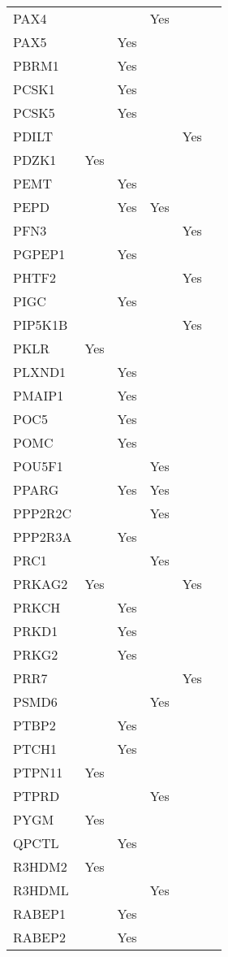 \documentclass[]{report}
\begin{document}
\begin{appendices}
\begin{longtable}[t]{llllll}
PAX4 &  &  & Yes &  & \\
PAX5 &  & Yes &  &  & \\
PBRM1 &  & Yes &  &  & \\
PCSK1 &  & Yes &  &  & \\
PCSK5 &  & Yes &  &  & \\
PDILT &  &  &  & Yes & \\
PDZK1 & Yes &  &  &  & \\
PEMT &  & Yes &  &  & \\
PEPD &  & Yes & Yes &  & \\
PFN3 &  &  &  & Yes & \\
PGPEP1 &  & Yes &  &  & \\
PHTF2 &  &  &  & Yes & \\
PIGC &  & Yes &  &  & \\
PIP5K1B &  &  &  & Yes & \\
PKLR & Yes &  &  &  & \\
PLXND1 &  & Yes &  &  & \\
PMAIP1 &  & Yes &  &  & \\
POC5 &  & Yes &  &  & \\
POMC &  & Yes &  &  & \\
POU5F1 &  &  & Yes &  & \\
PPARG &  & Yes & Yes &  & \\
PPP2R2C &  &  & Yes &  & \\
PPP2R3A &  & Yes &  &  & \\
PRC1 &  &  & Yes &  & \\
PRKAG2 & Yes &  &  & Yes & \\
PRKCH &  & Yes &  &  & \\
PRKD1 &  & Yes &  &  & \\
PRKG2 &  & Yes &  &  & \\
PRR7 &  &  &  & Yes & \\
PSMD6 &  &  & Yes &  & \\
PTBP2 &  & Yes &  &  & \\
PTCH1 &  & Yes &  &  & \\
PTPN11 & Yes &  &  &  & \\
PTPRD &  &  & Yes &  & \\
PYGM & Yes &  &  &  & \\
QPCTL &  & Yes &  &  & \\
R3HDM2 & Yes &  &  &  & \\
R3HDML &  &  & Yes &  & \\
RABEP1 &  & Yes &  &  & \\
RABEP2 &  & Yes &  &  & \\

\end{longtable}
\end{appendices}
\end{document}
